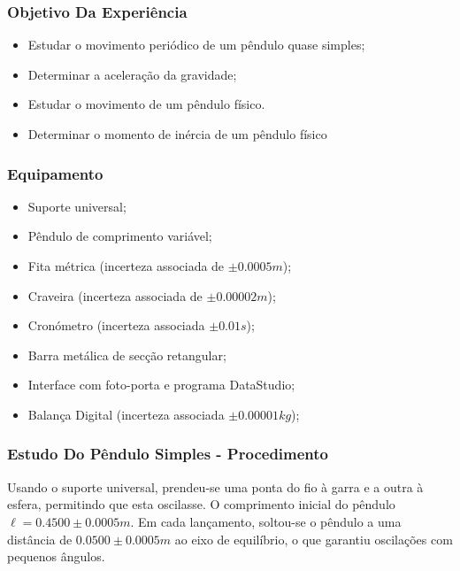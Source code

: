 \documentclass{beamer}
\begin{document}
\begin{frame}  
	\frametitle{Objetivo Da Experiência}
	\begin{itemize}
		\item Estudar o movimento periódico de um pêndulo quase simples;
		\item Determinar a aceleração da gravidade;
		\item Estudar o movimento de um pêndulo físico.
		\item Determinar o momento de inércia de um pêndulo físico
	\end{itemize}
\end{frame}

\begin{frame}
	\frametitle{Equipamento}
	\begin{itemize}
		\item Suporte universal;
		\item Pêndulo de comprimento 				variável;
		\item Fita métrica (incerteza 				associada de $\pm 0.0005 m$);
		\item Craveira (incerteza associada 		de $\pm 0.00002 m$);
		\item Cronómetro (incerteza 				associada $\pm 0.01s$);
		\item Barra metálica de secção 				retangular;
		\item Interface com foto-porta e 			programa DataStudio;
		\item Balança Digital (incerteza 			associada $\pm 0.00001 kg$);
	\end{itemize}
\end{frame}

\begin{frame}
	\frametitle{Estudo Do Pêndulo Simples - Procedimento}
	Usando o suporte universal, prendeu-se uma ponta do fio à garra e a outra à esfera, permitindo que 	esta oscilasse. O comprimento inicial do pêndulo $\ell=0.4500 \pm 0.0005 m$.
	Em cada lançamento, soltou-se o pêndulo a uma distância de $0.0500 \pm 0.0005 m $ ao eixo de 			equilíbrio, o que garantiu oscilações com pequenos ângulos.
\end{frame}
\end{document}
